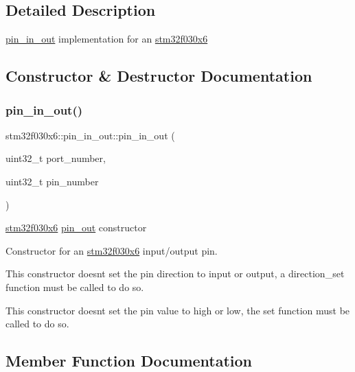 \subsection{Detailed Description}
\hyperlink{classstm32f030x6_1_1pin__in__out}{pin\+\_\+in\+\_\+out} implementation for an \hyperlink{namespacestm32f030x6}{stm32f030x6} 

\subsection{Constructor \& Destructor Documentation}
\mbox{\label{classstm32f030x6_1_1pin__in__out_a5d50cdae0ea2ce5bce18c93f4a16cebe}} 
\subsubsection{\texorpdfstring{pin\+\_\+in\+\_\+out()}{pin\_in\_out()}}
{\footnotesize\ttfamily stm32f030x6\+::pin\+\_\+in\+\_\+out\+::pin\+\_\+in\+\_\+out (\begin{DoxyParamCaption}\item[{uint32\+\_\+t}]{port\+\_\+number,  }\item[{uint32\+\_\+t}]{pin\+\_\+number }\end{DoxyParamCaption})\hspace{0.3cm}{\ttfamily [inline]}}

\hyperlink{namespacestm32f030x6}{stm32f030x6} \hyperlink{classstm32f030x6_1_1pin__out}{pin\+\_\+out} constructor

Constructor for an \hyperlink{namespacestm32f030x6}{stm32f030x6} input/output pin.

This constructor doesn\textquotesingle{}t set the pin direction to input or output, a direction\+\_\+set function must be called to do so.

This constructor doesn\textquotesingle{}t set the pin value to high or low, the set function must be called to do so. 

\subsection{Member Function Documentation}
\mbox{\label{classstm32f030x6_1_1pin__in__out_abb67031a092b24143ae7db116b876774}} 
